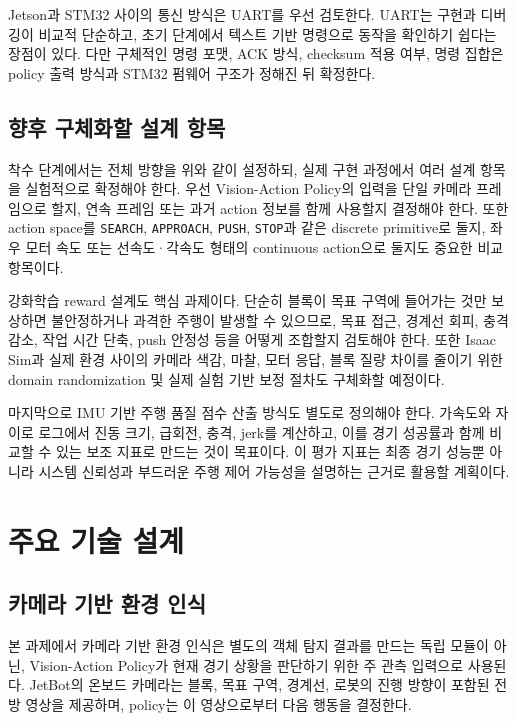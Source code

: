 \documentclass[titlepage]{pnureport}
\begin{document}
Jetson과 STM32 사이의 통신 방식은 UART를 우선 검토한다. UART는 구현과 디버깅이 비교적 단순하고, 초기 단계에서 텍스트 기반 명령으로 동작을 확인하기 쉽다는 장점이 있다. 다만 구체적인 명령 포맷, ACK 방식, checksum 적용 여부, 명령 집합은 policy 출력 방식과 STM32 펌웨어 구조가 정해진 뒤 확정한다.

\section{향후 구체화할 설계 항목}

착수 단계에서는 전체 방향을 위와 같이 설정하되, 실제 구현 과정에서 여러 설계 항목을 실험적으로 확정해야 한다. 우선 Vision-Action Policy의 입력을 단일 카메라 프레임으로 할지, 연속 프레임 또는 과거 action 정보를 함께 사용할지 결정해야 한다. 또한 action space를 \texttt{SEARCH}, \texttt{APPROACH}, \texttt{PUSH}, \texttt{STOP}과 같은 discrete primitive로 둘지, 좌우 모터 속도 또는 선속도·각속도 형태의 continuous action으로 둘지도 중요한 비교 항목이다.

강화학습 reward 설계도 핵심 과제이다. 단순히 블록이 목표 구역에 들어가는 것만 보상하면 불안정하거나 과격한 주행이 발생할 수 있으므로, 목표 접근, 경계선 회피, 충격 감소, 작업 시간 단축, push 안정성 등을 어떻게 조합할지 검토해야 한다. 또한 Isaac Sim과 실제 환경 사이의 카메라 색감, 마찰, 모터 응답, 블록 질량 차이를 줄이기 위한 domain randomization 및 실제 실험 기반 보정 절차도 구체화할 예정이다.

마지막으로 IMU 기반 주행 품질 점수 산출 방식도 별도로 정의해야 한다. 가속도와 자이로 로그에서 진동 크기, 급회전, 충격, jerk를 계산하고, 이를 경기 성공률과 함께 비교할 수 있는 보조 지표로 만드는 것이 목표이다. 이 평가 지표는 최종 경기 성능뿐 아니라 시스템 신뢰성과 부드러운 주행 제어 가능성을 설명하는 근거로 활용할 계획이다.

\chapter{주요 기술 설계}

\section{카메라 기반 환경 인식}

본 과제에서 카메라 기반 환경 인식은 별도의 객체 탐지 결과를 만드는 독립 모듈이 아닌, Vision-Action Policy가 현재 경기 상황을 판단하기 위한 주 관측 입력으로 사용된다. JetBot의 온보드 카메라는 블록, 목표 구역, 경계선, 로봇의 진행 방향이 포함된 전방 영상을 제공하며, policy는 이 영상으로부터 다음 행동을 결정한다.
\end{document}
